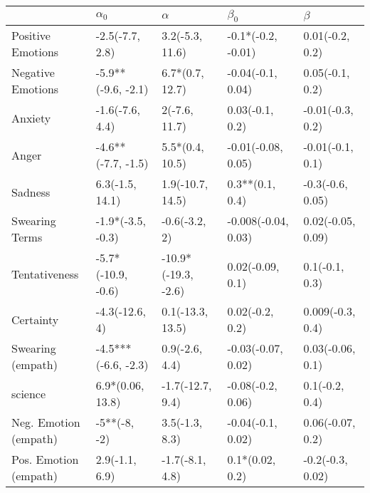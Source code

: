 \begin{tabular}{lllll}
\toprule
{} &           $\alpha_0$ &             $\alpha$ &            $\beta_0$ &            $\beta$ \\
\midrule
Positive Emotions     &      -2.5(-7.7, 2.8) &      3.2(-5.3, 11.6) &   -0.1*(-0.2, -0.01) &    0.01(-0.2, 0.2) \\
Negative Emotions     &   -5.9**(-9.6, -2.1) &      6.7*(0.7, 12.7) &    -0.04(-0.1, 0.04) &    0.05(-0.1, 0.2) \\
Anxiety               &      -1.6(-7.6, 4.4) &        2(-7.6, 11.7) &      0.03(-0.1, 0.2) &   -0.01(-0.3, 0.2) \\
Anger                 &   -4.6**(-7.7, -1.5) &      5.5*(0.4, 10.5) &   -0.01(-0.08, 0.05) &   -0.01(-0.1, 0.1) \\
Sadness               &      6.3(-1.5, 14.1) &     1.9(-10.7, 14.5) &      0.3**(0.1, 0.4) &   -0.3(-0.6, 0.05) \\
Swearing Terms        &    -1.9*(-3.5, -0.3) &        -0.6(-3.2, 2) &  -0.008(-0.04, 0.03) &  0.02(-0.05, 0.09) \\
Tentativeness         &   -5.7*(-10.9, -0.6) &  -10.9*(-19.3, -2.6) &     0.02(-0.09, 0.1) &     0.1(-0.1, 0.3) \\
Certainty             &       -4.3(-12.6, 4) &     0.1(-13.3, 13.5) &      0.02(-0.2, 0.2) &   0.009(-0.3, 0.4) \\
Swearing (empath)     &  -4.5***(-6.6, -2.3) &       0.9(-2.6, 4.4) &   -0.03(-0.07, 0.02) &   0.03(-0.06, 0.1) \\
science               &     6.9*(0.06, 13.8) &     -1.7(-12.7, 9.4) &    -0.08(-0.2, 0.06) &     0.1(-0.2, 0.4) \\
Neg. Emotion (empath) &         -5**(-8, -2) &       3.5(-1.3, 8.3) &    -0.04(-0.1, 0.02) &   0.06(-0.07, 0.2) \\
Pos. Emotion (empath) &       2.9(-1.1, 6.9) &      -1.7(-8.1, 4.8) &      0.1*(0.02, 0.2) &   -0.2(-0.3, 0.02) \\
\bottomrule
\end{tabular}
